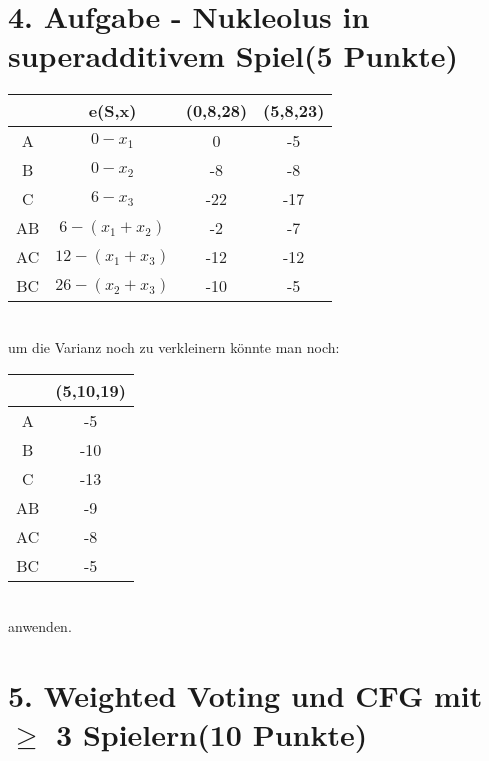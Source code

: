 \documentclass[a4paper, 11pt]{article}
\begin{document}
\section*{4. Aufgabe - Nukleolus in superadditivem Spiel\hfill {\small (5 Punkte)}}
\begin{tabular}{c || c c c}
& e(S,x) & (0,8,28) & (5,8,23) \\ \hline
A & $0-x_1$ & 0 & -5\\
B & $0-x_2$ & -8 & -8\\
C & $6-x_3$ & -22 & -17\\
AB & $6-(x_1+x_2)$ & -2 & -7\\
AC & $12-(x_1+x_3)$ & -12 & -12\\
BC & $26-(x_2+x_3)$ & -10 & -5\\

\end{tabular}\\
um die Varianz noch zu verkleinern könnte man noch:

\begin{tabular}{c || c}
& (5,10,19) \\ \hline
A &-5\\
B & -10\\
C & -13\\
AB & -9\\
AC & -8\\
BC & -5\\

\end{tabular}\\
anwenden.

\section*{5. Weighted Voting und CFG mit $\geq$ 3 Spielern\hfill {\small (10 Punkte)}}
\end{document}
